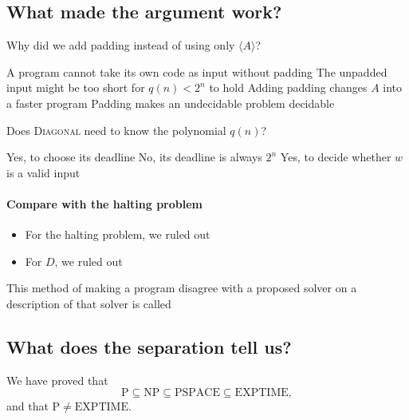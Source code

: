 \documentclass[11  pt]{article}
\begin{document}
\newpage
\subsection*{What made the argument work?}
\begin{Qu}
    Why did we add padding instead of using only $\langle A\rangle$?
    \begin{itemize}
        \aitem A program cannot take its own code as input without padding
        \bitem The unpadded input might be too short for $q(n)<2^n$ to hold
        \citem Adding padding changes $A$ into a faster program
        \ditem Padding makes an undecidable problem decidable
    \end{itemize}
\end{Qu}

\vs{.5cm}
\begin{Qu}
    Does \textsc{Diagonal} need to know the polynomial $q(n)$?
    \begin{itemize}
        \aitem Yes, to choose its deadline
        \bitem No, its deadline is always $2^n$
        \citem Yes, to decide whether $w$ is a valid input
    \end{itemize}
\end{Qu}

\paragraph{Compare with the halting problem}
\begin{itemize}
    \item For the halting problem, we ruled out 
    \vs{.5cm}
    \item For $D$, we ruled out 
\end{itemize}

\vfill
This method of making a program disagree with a proposed solver on a description of that solver is called 


\newpage
\subsection*{What does the separation tell us?}
We have proved that
\begin{equation*}
    \mathrm{P}\subseteq\mathrm{NP}\subseteq\mathrm{PSPACE}\subseteq\mathrm{EXPTIME},
\end{equation*}
and that $\mathrm{P}\neq\mathrm{EXPTIME}$.
\end{document}
